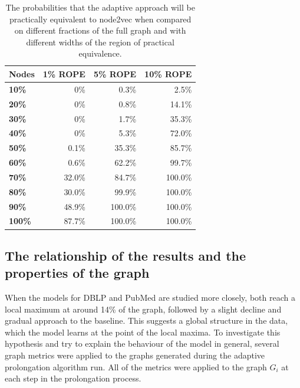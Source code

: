 \begin{table}
  \caption{The probabilities that the adaptive approach will be practically equivalent to node2vec when compared on different fractions of the full graph and with different widths of the region of practical equivalence.}
  \label{tab:bayesian-adaptive}
  \centering
  \begin{tabular}{lrrr}
    \toprule
    \textbf{Nodes} & \textbf{1\% ROPE} & \textbf{5\% ROPE} & \textbf{10\% ROPE} \\
    \midrule
    \textbf{10\%}  & 0\%               & 0.3\%             & 2.5\%              \\
    \textbf{20\%}  & 0\%               & 0.8\%             & 14.1\%             \\
    \textbf{30\%}  & 0\%               & 1.7\%             & 35.3\%             \\
    \textbf{40\%}  & 0\%               & 5.3\%             & 72.0\%             \\
    \textbf{50\%}  & 0.1\%             & 35.3\%            & 85.7\%             \\
    \textbf{60\%}  & 0.6\%             & 62.2\%            & 99.7\%             \\
    \textbf{70\%}  & 32.0\%            & 84.7\%            & 100.0\%            \\
    \textbf{80\%}  & 30.0\%            & 99.9\%            & 100.0\%            \\
    \textbf{90\%}  & 48.9\%            & 100.0\%           & 100.0\%            \\
    \textbf{100\%} & 87.7\%            & 100.0\%           & 100.0\%            \\
    \bottomrule
  \end{tabular}
\end{table}

\subsection{The relationship of the results and the properties of the graph}

When the models for DBLP and PubMed are studied more closely, both reach a local maximum at around 14\% of the graph, followed by a slight decline and gradual approach to the baseline. This suggests a global structure in the data, which the model learns at the point of the local maxima. To investigate this hypothesis and try to explain the behaviour of the model in general, several graph metrics were applied to the graphs generated during the adaptive prolongation algorithm run. All of the metrics were applied to the graph \( G_i \) at each step in the prolongation process.

